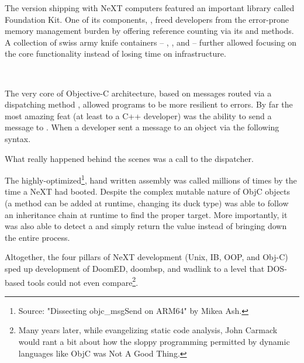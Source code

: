 \par
\vspace{-5pt}
The version shipping with NeXT computers featured an important library called Foundation Kit. One of its components, , freed developers from the error-prone memory management burden by offering reference counting via its  and  methods. A collection of swiss army knife containers -- , ,  and  -- further allowed focusing on the core functionality instead of losing time on infrastructure.\\
\par
{}\\
\par
The very core of Objective-C architecture, based on messages routed via a dispatching method , allowed programs to be more resilient to errors. By far the most amazing feat (at least to a C++ developer) was the ability to send a message to . When a developer sent a message to an object via the following syntax.\\ \par
{}
What really happened behind the scenes was a call to the dispatcher.\\
\par
{}
The highly-optimized\footnote{Source: "Dissecting objc\_msgSend on ARM64" by Mikea Ash.}, hand written assembly was called millions of times by the time a NeXT had booted. Despite the complex mutable nature of ObjC objects (a method can be added at runtime, changing its duck type)  was able to follow an inheritance chain at runtime to find the proper target. More importantly, it was also able to detect a  and simply return the value  instead of bringing down the entire process.\\
\par

Altogether, the four pillars of NeXT development (Unix, IB, OOP, and Obj-C) sped up development of DoomED, doombsp, and wadlink to a level that DOS-based tools could not even compare\footnote{Many years later, while evangelizing static code analysis, John Carmack would rant a bit about how the sloppy programming permitted by dynamic languages like ObjC was Not A Good Thing.}.

